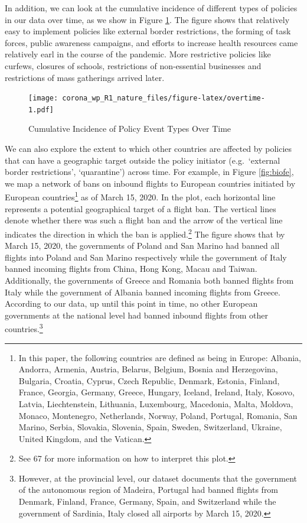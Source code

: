 \documentclass[
]{article}
\begin{document}
In addition, we can look at the cumulative incidence of different types of policies in our data over time, as we show in Figure \ref{fig:overtime}. The figure shows that relatively easy to implement policies like external border restrictions, the forming of task forces, public awareness campaigns, and efforts to increase health resources came relatively earl in the course of the pandemic. More restrictive policies like curfews, closures of schools, restrictions of non-essential businesses and restrictions of mass gatherings arrived later.

\begin{figure}
\centering
\texttt{[image: corona\_wp\_R1\_nature\_files/figure-latex/overtime-1.pdf]}
\caption{\label{fig:overtime}Cumulative Incidence of Policy Event Types Over Time}
\end{figure}

We can also explore the extent to which other countries are affected by policies that can have a geographic target outside the policy initiator (e.g.~`external border restrictions', `quarantine') across time. For example, in Figure \ref{fig:biofe}, we map a network of bans on inbound flights to European countries initiated by European countries\footnote{In this paper, the following countries are defined as being in Europe: Albania, Andorra, Armenia, Austria, Belarus, Belgium, Bosnia and Herzegovina, Bulgaria, Croatia, Cyprus, Czech Republic, Denmark, Estonia, Finland, France, Georgia, Germany, Greece, Hungary, Iceland, Ireland, Italy, Kosovo, Latvia, Liechtenstein, Lithuania, Luxembourg, Macedonia, Malta, Moldova, Monaco, Montenegro, Netherlands, Norway, Poland, Portugal, Romania, San Marino, Serbia, Slovakia, Slovenia, Spain, Sweden, Switzerland, Ukraine, United Kingdom, and the Vatican.} as of March 15, 2020. In the plot, each horizontal line represents a potential geographical target of a flight ban. The vertical lines denote whether there was such a flight ban and the arrow of the vertical line indicates the direction in which the ban is applied.\footnote{See 67 for more information on how to interpret this plot.} The figure shows that by March 15, 2020, the governments of Poland and San Marino had banned all flights into Poland and San Marino respectively while the government of Italy banned incoming flights from China, Hong Kong, Macau and Taiwan. Additionally, the governments of Greece and Romania both banned flights from Italy while the government of Albania banned incoming flights from Greece. According to our data, up until this point in time, no other European governments at the national level had banned inbound flights from other countries.\footnote{However, at the provincial level, our dataset documents that the government of the autonomous region of Madeira, Portugal had banned flights from Denmark, Finland, France, Germany, Spain, and Switzerland while the government of Sardinia, Italy closed all airports by March 15, 2020.}
\end{document}
